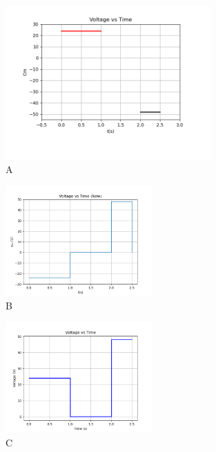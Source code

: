 \documentclass{article}
\begin{document}
\begin{enumerate}
    \begin{figure}[h!]
    \centering
      \hspace{-1cm}
      \includegraphics[width=0.7\textwidth]{Figure_6.png}
      \caption{A}
      \label{fig:your_label}
    \end{figure}

   \begin{figure}[h!]
    \centering
      \hspace{-1cm}
      \includegraphics[width=0.5\textwidth]{Figure_7.png}
      \caption{B}
      \label{fig:your_label}
    \end{figure}

    \begin{figure}[h!]
    \centering
      \hspace{-1cm}
      \includegraphics[width=0.5\textwidth]{Figure_8.png}
      \caption{C}
      \label{fig:your_label}
    \end{figure}


\end{enumerate}
\end{document}
